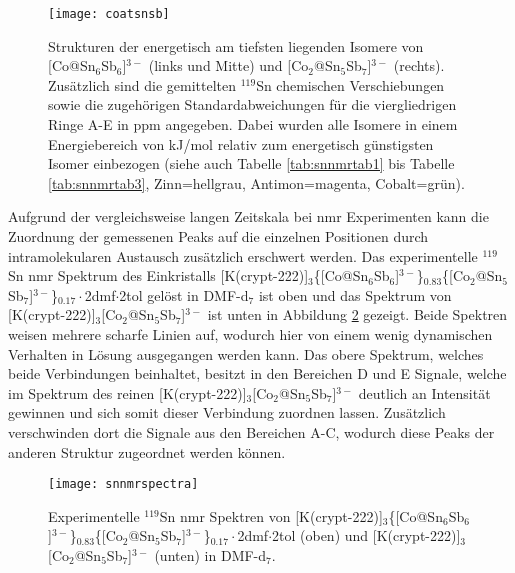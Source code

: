 \begin{figure}[ht!]
	\centering
	\texttt{[image: coatsnsb]}
	\captionsetup{figurewithin = chapter}
	\captionsetup{font=small, labelfont=bf}\caption[Strukturen von {[Co@Sn$_6$Sb$_6$]$^{3-}$ und [Co$_2$@Sn$_5$Sb$_7$]$^{3-}$}]{Strukturen der energetisch am tiefsten liegenden Isomere von [Co@Sn$_6$Sb$_6$]$^{3-}$ (links und Mitte) und [Co$_2$@Sn$_5$Sb$_7$]$^{3-}$ (rechts). Zusätzlich sind die gemittelten $^{119}$Sn chemischen Verschiebungen sowie die zugehörigen Standardabweichungen für die viergliedrigen Ringe A-E in ppm angegeben. Dabei wurden alle Isomere in einem Energiebereich von \unit[10]{kJ/mol} relativ zum energetisch günstigsten Isomer einbezogen (siehe auch Tabelle \ref{tab:snnmrtab1} bis Tabelle \ref{tab:snnmrtab3}, Zinn=hellgrau, Antimon=magenta, Cobalt=grün).}
\label{abb:coatsnsb}
\end{figure}
\FloatBarrier
Aufgrund der vergleichsweise langen Zeitskala bei \ac{nmr} Experimenten kann die Zuordnung der gemessenen Peaks auf die einzelnen Positionen durch intramolekularen Austausch zusätzlich erschwert werden. Das experimentelle $^{119}$Sn \ac{nmr} Spektrum des Einkristalls [K(crypt-222)]$_3$\{[Co@Sn$_6$Sb$_6$]$^{3-}$\}$_{0.83}$\{[Co$_2$@Sn$_5$Sb$_7$]$^{3-}$\}$_{0.17}\cdot$2dmf$\cdot$2tol gelöst in DMF-d$_7$ ist oben und das Spektrum von [K(crypt-222)]$_3$[Co$_2$@Sn$_5$Sb$_7$]$^{3-}$ ist unten in Abbildung \ref{abb:expsnnmr} gezeigt. Beide Spektren weisen mehrere scharfe Linien auf, wodurch hier von einem wenig dynamischen Verhalten in Lösung ausgegangen werden kann. Das obere Spektrum, welches beide Verbindungen beinhaltet, besitzt in den Bereichen D und E Signale, welche im Spektrum des reinen [K(crypt-222)]$_3$[Co$_2$@Sn$_5$Sb$_7$]$^{3-}$ deutlich an Intensität gewinnen und sich somit dieser Verbindung zuordnen lassen. Zusätzlich verschwinden dort die Signale aus den Bereichen A-C, wodurch diese Peaks der anderen Struktur zugeordnet werden können. 
\begin{figure}[ht!]
	\centering
	\texttt{[image: snnmrspectra]}
	\captionsetup{figurewithin = chapter}
	\captionsetup{font=small, labelfont=bf}\caption[{$^{119}$Sn \ac{nmr} Spektren von [Co@Sn$_6$Sb$_6$]$^{3-}$ und [Co$_2$@Sn$_5$Sb$_7$]$^{3-}$}]{Experimentelle $^{119}$Sn \ac{nmr} Spektren von [K(crypt-222)]$_3$\{[Co@Sn$_6$Sb$_6$]$^{3-}$\}$_{0.83}$\{[Co$_2$@Sn$_5$Sb$_7$]$^{3-}$\}$_{0.17}\cdot$2dmf$\cdot$2tol (oben) und [K(crypt-222)]$_3$[Co$_2$@Sn$_5$Sb$_7$]$^{3-}$ (unten) in DMF-d$_7$.}
\label{abb:expsnnmr}
\end{figure}
\FloatBarrier

